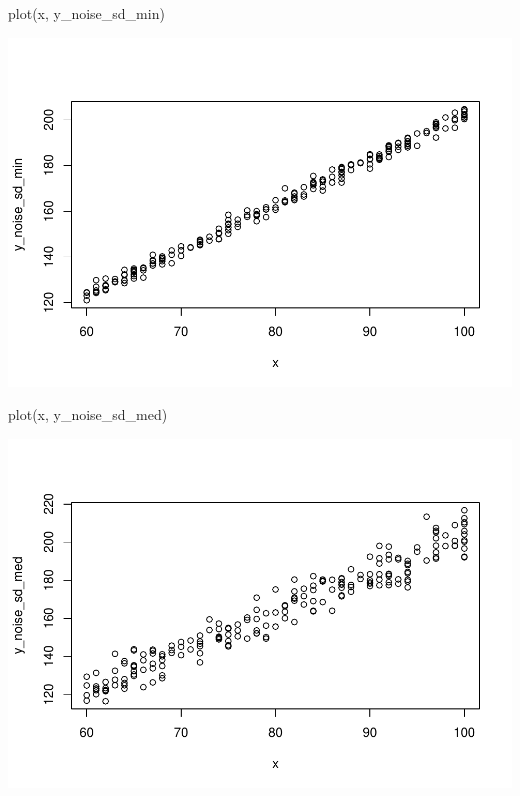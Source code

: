 \documentclass[
]{book}
\newenvironment{Shaded}{\begin{snugshade}}{\end{snugshade}}
\newcommand{\FunctionTok}[1]{\textcolor[rgb]{0.00,0.00,0.00}{#1}}
\newcommand{\NormalTok}[1]{#1}
\begin{document}
\begin{Shaded}
\begin{Highlighting}[]
\FunctionTok{plot}\NormalTok{(x, y\_noise\_sd\_min)}
\end{Highlighting}
\end{Shaded}

\includegraphics{test_course_notes_files/figure-latex/remedy030-2.pdf}

\begin{Shaded}
\begin{Highlighting}[]
\FunctionTok{plot}\NormalTok{(x, y\_noise\_sd\_med)}
\end{Highlighting}
\end{Shaded}

\includegraphics{test_course_notes_files/figure-latex/remedy030-3.pdf}
\end{document}
